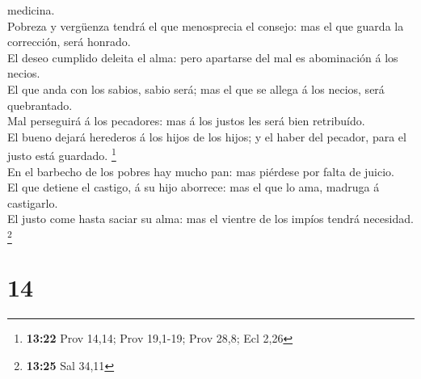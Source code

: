 medicina.\\
 Pobreza y vergüenza tendrá el que menosprecia el consejo:
mas el que guarda la corrección, será honrado.\\
 El deseo cumplido deleita el alma: pero apartarse del mal
es abominación á los necios.\\
 El que anda con los sabios, sabio será; mas el que se
allega á los necios, será quebrantado.\\
 Mal perseguirá á los pecadores: mas á los justos les será
bien retribuído.\\
 El bueno dejará herederos á los hijos de los hijos; y el
haber del pecador, para el justo está guardado. \footnote{\textbf{13:22}
  Prov 14,14; Prov 19,1-19; Prov 28,8; Ecl 2,26}\\
 En el barbecho de los pobres hay mucho pan: mas piérdese
por falta de juicio.\\
 El que detiene el castigo, á su hijo aborrece: mas el que
lo ama, madruga á castigarlo.\\
 El justo come hasta saciar su alma: mas el vientre de los
impíos tendrá necesidad. \footnote{\textbf{13:25} Sal 34,11}

\hypertarget{section-13}{%
\section{14}\label{section-13}}

